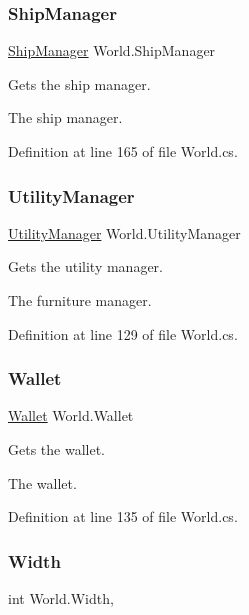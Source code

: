 \subsubsection{\texorpdfstring{Ship\+Manager}{ShipManager}}
{\footnotesize\ttfamily \hyperlink{class_ship_manager}{Ship\+Manager} World.\+Ship\+Manager\hspace{0.3cm}{\ttfamily [get]}}



Gets the ship manager. 

The ship manager.

Definition at line 165 of file World.\+cs.

\mbox{\label{class_world_a093670f1e25572daa8cadd96ab295250}} 
\subsubsection{\texorpdfstring{Utility\+Manager}{UtilityManager}}
{\footnotesize\ttfamily \hyperlink{class_utility_manager}{Utility\+Manager} World.\+Utility\+Manager\hspace{0.3cm}{\ttfamily [get]}}

Gets the utility manager. 

The furniture manager.

Definition at line 129 of file World.\+cs.

\mbox{\label{class_world_a844a3f990503926d99a0a3410399f48f}} 
\subsubsection{\texorpdfstring{Wallet}{Wallet}}
{\footnotesize\ttfamily \hyperlink{class_wallet}{Wallet} World.\+Wallet\hspace{0.3cm}{\ttfamily [get]}}



Gets the wallet. 

The wallet.

Definition at line 135 of file World.\+cs.

\mbox{\label{class_world_a861a1e47079f04cf1de46887f76f6177}} 
\subsubsection{\texorpdfstring{Width}{Width}}
{\footnotesize\ttfamily int World.\+Width\hspace{0.3cm}{\ttfamily [get]}, {}}



